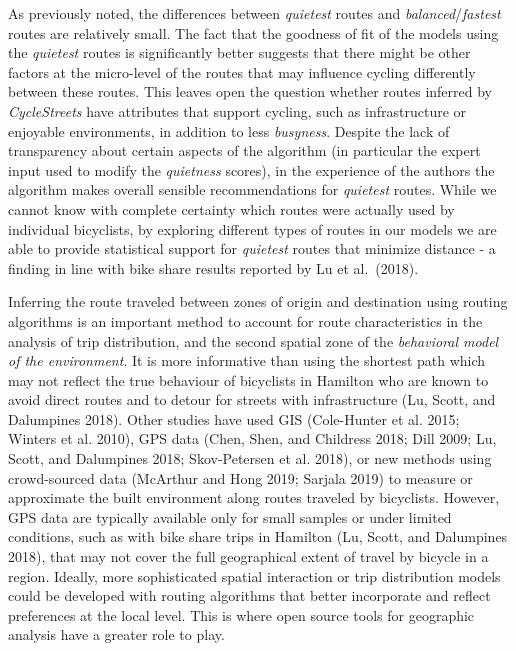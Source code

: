 \documentclass[smallextended]{svjour3}       %
\begin{document}
As previously noted, the differences between \emph{quietest} routes and
\emph{balanced}/\emph{fastest} routes are relatively small. The fact
that the goodness of fit of the models using the \emph{quietest} routes
is significantly better suggests that there might be other factors at
the micro-level of the routes that may influence cycling differently
between these routes. This leaves open the question whether routes
inferred by \emph{CycleStreets} have attributes that support cycling,
such as infrastructure or enjoyable environments, in addition to less
\emph{busyness}. Despite the lack of transparency about certain aspects
of the algorithm (in particular the expert input used to modify the
\emph{quietness} scores), in the experience of the authors the algorithm
makes overall sensible recommendations for \emph{quietest} routes. While
we cannot know with complete certainty which routes were actually used
by individual bicyclists, by exploring different types of routes in our
models we are able to provide statistical support for \emph{quietest}
routes that minimize distance - a finding in line with bike share
results reported by Lu et al.~(2018).

Inferring the route traveled between zones of origin and destination
using routing algorithms is an important method to account for route
characteristics in the analysis of trip distribution, and the second
spatial zone of the \emph{behavioral model of the environment}. It is
more informative than using the shortest path which may not reflect the
true behaviour of bicyclists in Hamilton who are known to avoid direct
routes and to detour for streets with infrastructure (Lu, Scott, and
Dalumpines 2018). Other studies have used GIS (Cole-Hunter et al. 2015;
Winters et al. 2010), GPS data (Chen, Shen, and Childress 2018; Dill
2009; Lu, Scott, and Dalumpines 2018; Skov-Petersen et al. 2018), or new
methods using crowd-sourced data (McArthur and Hong 2019; Sarjala 2019)
to measure or approximate the built environment along routes traveled by
bicyclists. However, GPS data are typically available only for small
samples or under limited conditions, such as with bike share trips in
Hamilton (Lu, Scott, and Dalumpines 2018), that may not cover the full
geographical extent of travel by bicycle in a region. Ideally, more
sophisticated spatial interaction or trip distribution models could be
developed with routing algorithms that better incorporate and reflect
preferences at the local level. This is where open source tools for
geographic analysis have a greater role to play.
\end{document}
